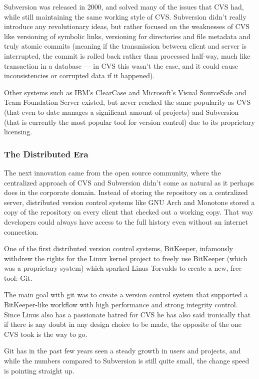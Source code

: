 \documentclass{article}
\begin{document}
Subversion was released in 2000, and solved many of the issues that
CVS had, while still maintaining the same working style of
CVS. Subversion didn't really introduce any revolutionary ideas, but
rather focused on the weaknesses of CVS like versioning of symbolic
links, versioning for directories and file metadata and truly atomic
commits (meaning if the transmission between client and server is
interrupted, the commit is rolled back rather than processed half-way,
much like transaction in a database --- in CVS this wasn't the case,
and it could cause inconsistencies or corrupted data if it happened).

Other systems such as IBM's ClearCase and Microsoft's Visual
SourceSafe and Team Foundation Server existed, but never reached the
same popularity as CVS (that even to date manages a significant amount
of projects) and Subversion (that is currently the most popular tool
for version control) due to its proprietary licensing.

\subsubsection{The Distributed Era}

The next innovation came from the open source community, where the
centralized approach of CVS and Subversion didn't come as natural as
it perhaps does in the corporate domain. Instead of storing the
repository on a centralized server, distributed version control
systems like GNU Arch and Monotone stored a copy of the repository on
every client that checked out a working copy. That way developers
could always have access to the full history even without an internet
connection.

One of the first distributed version control systems, BitKeeper,
infamously withdrew the rights for the Linux kernel project to freely
use BitKeeper (which was a proprietary system) which sparked Linus
Torvalds to create a new, free tool: Git. 

The main goal with git was to create a version control system that
supported a BitKeeper-like workflow with high performance and strong
integrity control. Since Linus also has a passionate hatred for CVS he
has also said ironically that if there is any doubt in any design
choice to be made, the opposite of the one CVS took is the way to go.

Git has in the past few years seen a steady growth in users and
projects, and while the numbers compared to Subversion is still quite
small, the change speed is pointing straight up.
\end{document}

